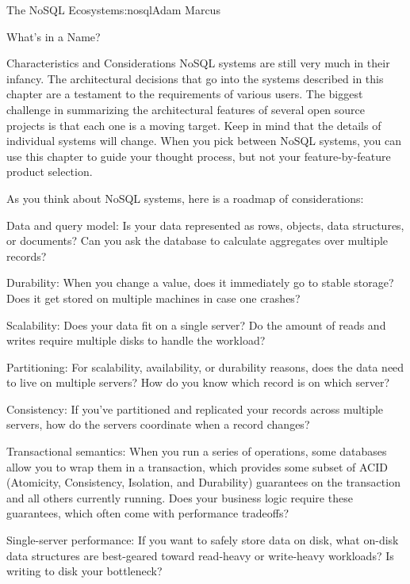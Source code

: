 \begin{aosachapter}{The NoSQL Ecosystem}{s:nosql}{Adam Marcus}
\begin{aosasect1}{What's in a Name?}
\begin{aosasect2}{Characteristics and Considerations}
NoSQL systems are still very much in their infancy.  The architectural
decisions that go into the systems described in this chapter are a
testament to the requirements of various users.  The biggest
challenge in summarizing the architectural features of several open
source projects is that each one is a moving target.  Keep in mind
that the details of individual systems will change. When you pick
between NoSQL systems, you can use this chapter to guide your thought
process, but not your feature-by-feature product selection.

\pagebreak

\noindent As you think about NoSQL systems, here is a roadmap of considerations:

\begin{aosadescription}

  \item{Data and query model}: Is your data represented as rows,
  objects, data structures, or documents? Can you ask the database to
  calculate aggregates over multiple records?

  \item{Durability}: When you change a value, does it immediately
  go to stable storage?  Does it get stored on multiple machines in
  case one crashes?

  \item{Scalability}: Does your data fit on a single server?  Do
  the amount of reads and writes require multiple disks to handle the
  workload?

  \item{Partitioning}: For scalability, availability, or
  durability reasons, does the data need to live on multiple servers?
  How do you know which record is on which server?

  \item{Consistency}: If you've partitioned and replicated your
  records across multiple servers, how do the servers coordinate when
  a record changes?

  \item{Transactional semantics}: When you run a series of
  operations, some databases allow you to wrap them in a transaction,
  which provides some subset of ACID (Atomicity, Consistency,
  Isolation, and Durability) guarantees on the transaction and all
  others currently running.  Does your business logic require these
  guarantees, which often come with performance tradeoffs?

  \item{Single-server performance}: If you want to safely store
  data on disk, what on-disk data structures are best-geared toward
  read-heavy or write-heavy workloads? Is writing to disk your
  bottleneck?


\end{aosadescription}
\end{aosasect2}
\end{aosasect1}
\end{aosachapter}
